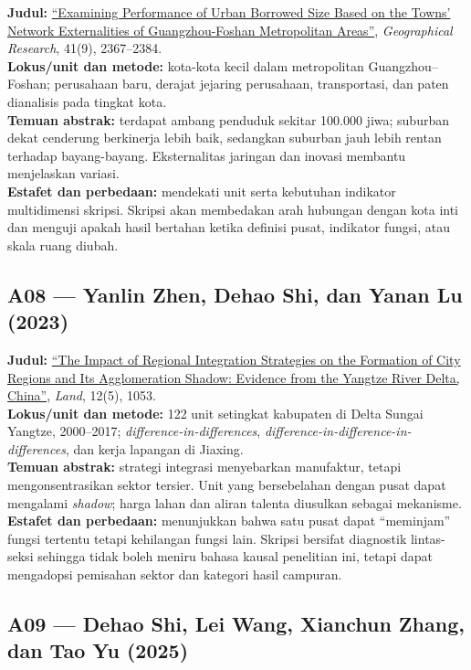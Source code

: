 \documentclass[
  indonesian,
  11pt,
  a4paper,
  oneside,
  openany]{report}
\begin{document}
\textbf{Judul:}
\href{https://doi.org/10.11821/dlyj020211036}{``Examining Performance of
Urban Borrowed Size Based on the Towns' Network Externalities of
Guangzhou-Foshan Metropolitan Areas''}, \emph{Geographical Research},
41(9), 2367--2384.\\
\textbf{Lokus/unit dan metode:} kota-kota kecil dalam metropolitan
Guangzhou--Foshan; perusahaan baru, derajat jejaring perusahaan,
transportasi, dan paten dianalisis pada tingkat kota.\\
\textbf{Temuan abstrak:} terdapat ambang penduduk sekitar 100.000 jiwa;
suburban dekat cenderung berkinerja lebih baik, sedangkan suburban jauh
lebih rentan terhadap bayang-bayang. Eksternalitas jaringan dan inovasi
membantu menjelaskan variasi.\\
\textbf{Estafet dan perbedaan:} mendekati unit serta kebutuhan indikator
multidimensi skripsi. Skripsi akan membedakan arah hubungan dengan kota
inti dan menguji apakah hasil bertahan ketika definisi pusat, indikator
fungsi, atau skala ruang diubah.

\subsection{A08 --- Yanlin Zhen, Dehao Shi, dan Yanan Lu
(2023)}\label{a08-yanlin-zhen-dehao-shi-dan-yanan-lu-2023}

\textbf{Judul:} \href{https://doi.org/10.3390/land12051053}{``The Impact
of Regional Integration Strategies on the Formation of City Regions and
Its Agglomeration Shadow: Evidence from the Yangtze River Delta,
China''}, \emph{Land}, 12(5), 1053.\\
\textbf{Lokus/unit dan metode:} 122 unit setingkat kabupaten di Delta
Sungai Yangtze, 2000--2017; \emph{difference-in-differences},
\emph{difference-in-difference-in-differences}, dan kerja lapangan di
Jiaxing.\\
\textbf{Temuan abstrak:} strategi integrasi menyebarkan manufaktur,
tetapi mengonsentrasikan sektor tersier. Unit yang bersebelahan dengan
pusat dapat mengalami \emph{shadow}; harga lahan dan aliran talenta
diusulkan sebagai mekanisme.\\
\textbf{Estafet dan perbedaan:} menunjukkan bahwa satu pusat dapat
``meminjam'' fungsi tertentu tetapi kehilangan fungsi lain. Skripsi
bersifat diagnostik lintas-seksi sehingga tidak boleh meniru bahasa
kausal penelitian ini, tetapi dapat mengadopsi pemisahan sektor dan
kategori hasil campuran.

\subsection{A09 --- Dehao Shi, Lei Wang, Xianchun Zhang, dan Tao Yu
(2025)}\label{a09-dehao-shi-lei-wang-xianchun-zhang-dan-tao-yu-2025}
\end{document}
